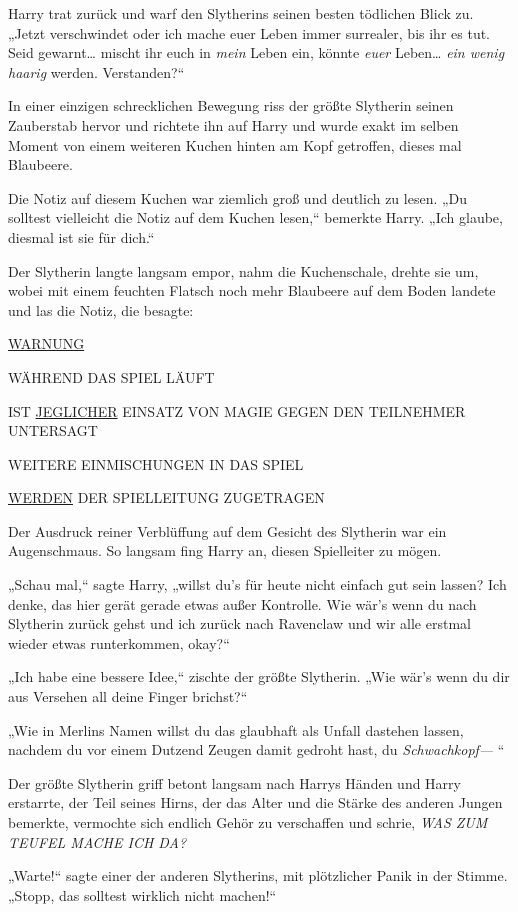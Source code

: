 {Harry trat zurück und warf den Slytherins seinen besten tödlichen Blick zu. „Jetzt verschwindet oder ich mache euer Leben immer surrealer, bis ihr es tut. Seid gewarnt… mischt ihr euch in \emph{mein} Leben ein, könnte \emph{euer} Leben… \emph{ein wenig haarig} werden. Verstanden?“

In einer einzigen schrecklichen Bewegung riss der größte Slytherin seinen Zauberstab hervor und richtete ihn auf Harry und wurde exakt im selben Moment von einem weiteren Kuchen hinten am Kopf getroffen, dieses mal Blaubeere.

Die Notiz auf diesem Kuchen war ziemlich groß und deutlich zu lesen. „Du solltest vielleicht die Notiz auf dem Kuchen lesen,“ bemerkte Harry. „Ich glaube, diesmal ist sie für dich.“

Der Slytherin langte langsam empor, nahm die Kuchenschale, drehte sie um, wobei mit einem feuchten Flatsch noch mehr Blaubeere auf dem Boden landete und las die Notiz, die besagte:

\uline{WARNUNG}

WÄHREND DAS SPIEL LÄUFT

IST \uline{JEGLICHER} EINSATZ VON MAGIE GEGEN DEN TEILNEHMER UNTERSAGT

WEITERE EINMISCHUNGEN IN DAS SPIEL

\uline{WERDEN} DER SPIELLEITUNG ZUGETRAGEN

Der Ausdruck reiner Verblüffung auf dem Gesicht des Slytherin war ein Augenschmaus. So langsam fing Harry an, diesen Spielleiter zu mögen.

„Schau mal,“ sagte Harry, „willst du's für heute nicht einfach gut sein lassen? Ich denke, das hier gerät gerade etwas außer Kontrolle. Wie wär's wenn du nach Slytherin zurück gehst und ich zurück nach Ravenclaw und wir alle erstmal wieder etwas runterkommen, okay?“

„Ich habe eine bessere Idee,“ zischte der größte Slytherin. „Wie wär's wenn du dir aus Versehen all deine Finger brichst?“

„Wie in Merlins Namen willst du das glaubhaft als Unfall dastehen lassen, nachdem du vor einem Dutzend Zeugen damit gedroht hast, du \emph{Schwachkopf—} “

Der größte Slytherin griff betont langsam nach Harrys Händen und Harry erstarrte, der Teil seines Hirns, der das Alter und die Stärke des anderen Jungen bemerkte, vermochte sich endlich Gehör zu verschaffen und schrie, \emph{WAS ZUM TEUFEL MACHE ICH DA?}

„Warte!“ sagte einer der anderen Slytherins, mit plötzlicher Panik in der Stimme. „Stopp, das solltest wirklich nicht machen!“

}
